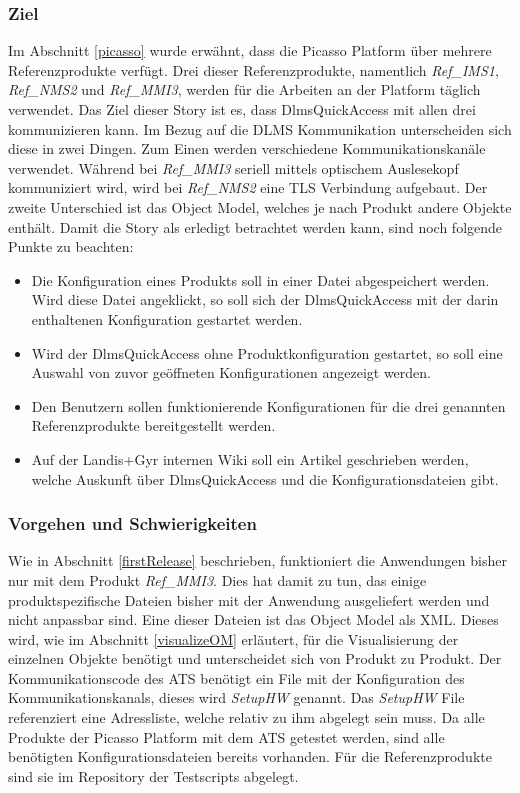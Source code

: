 \subsubsection{Ziel}
Im Abschnitt \ref{picasso} wurde erwähnt, dass die Picasso Platform über mehrere Referenzprodukte verfügt.
Drei dieser Referenzprodukte, namentlich \textit{Ref\_IMS1}, \textit{Ref\_NMS2} und \textit{Ref\_MMI3}, werden für die Arbeiten an der Platform täglich verwendet.
Das Ziel dieser Story ist es, dass DlmsQuickAccess mit allen drei kommunizieren kann.
Im Bezug auf die \ac{DLMS} Kommunikation unterscheiden sich diese in zwei Dingen.
Zum Einen werden verschiedene Kommunikationskanäle verwendet. 
Während bei \textit{Ref\_MMI3} seriell mittels optischem Auslesekopf kommuniziert wird, wird bei \textit{Ref\_NMS2} eine \ac{TLS} Verbindung aufgebaut.
Der zweite Unterschied ist das Object Model, welches je nach Produkt andere Objekte enthält.
Damit die Story als erledigt betrachtet werden kann, sind noch folgende Punkte zu beachten:
\begin{itemize}
   \item Die Konfiguration eines Produkts soll in einer Datei abgespeichert werden. Wird diese Datei angeklickt, so soll sich der DlmsQuickAccess mit der darin enthaltenen Konfiguration gestartet werden.
   \item Wird der DlmsQuickAccess ohne Produktkonfiguration gestartet, so soll eine Auswahl von zuvor geöffneten Konfigurationen angezeigt werden.
   \item Den Benutzern sollen funktionierende Konfigurationen für die drei genannten Referenzprodukte bereitgestellt werden.
   \item Auf der Landis+Gyr internen Wiki soll ein Artikel geschrieben werden, welche Auskunft über DlmsQuickAccess und die Konfigurationsdateien gibt.
\end{itemize}

\subsubsection{Vorgehen und Schwierigkeiten}\label{s3configvorgehen}
Wie in Abschnitt \ref{firstRelease} beschrieben, funktioniert die Anwendungen bisher nur mit dem Produkt \textit{Ref\_MMI3}.
Dies hat damit zu tun, das einige produktspezifische Dateien bisher mit der Anwendung ausgeliefert werden und nicht anpassbar sind.
Eine dieser Dateien ist das Object Model als XML. 
Dieses wird, wie im Abschnitt \ref{visualizeOM} erläutert, für die Visualisierung der einzelnen Objekte benötigt und unterscheidet sich von Produkt zu Produkt.
Der Kommunikationscode des \ac{ATS} benötigt ein File mit der Konfiguration des Kommunikationskanals, dieses wird \textit{SetupHW} genannt.
Das \textit{SetupHW} File referenziert eine Adressliste, welche relativ zu ihm abgelegt sein muss.
Da alle Produkte der Picasso Platform mit dem \ac{ATS} getestet werden, sind alle benötigten Konfigurationsdateien bereits vorhanden.
Für die Referenzprodukte sind sie im Repository der Testscripts abgelegt.

